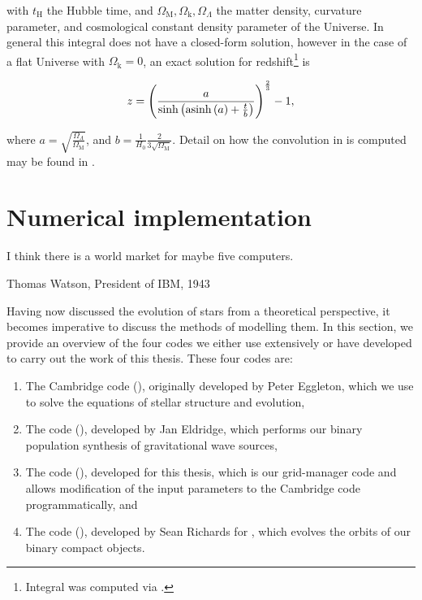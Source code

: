 with $t_\text{H}$ the Hubble time, and $\Omega_\text{M}, \Omega_\text{k}, \Omega_\Lambda$ the matter density, curvature parameter, and cosmological constant density parameter of the Universe. In general this integral does not have a closed-form solution, however in the case of a flat Universe with $\Omega_\text{k}=0$, an exact solution for redshift\footnote{Integral was computed via .} is

\begin{equation}
z = \left(\frac{a}{\sinh\left(\operatorname{asinh}{\left(a \right)}+\frac{t}{b}\right)}\right)^\frac23 - 1,
\end{equation}

where $a=\sqrt{\frac{\Omega_\Lambda}{\Omega_\text{M}}}$, and $b=\frac{1}{H_0}\frac{2}{3\sqrt{\Omega_\text{M}}}$. Detail on how the convolution in  is computed may be found in \citet{Richards:2021}.

\section{Numerical implementation}

\epigraph{I think there is a world market for maybe five computers.}{Thomas Watson, President of IBM, 1943}

Having now discussed the evolution of stars from a theoretical perspective, it becomes imperative to discuss the methods of modelling them. In this section, we provide an overview of the four codes we either use extensively or have developed to carry out the work of this thesis. These four codes are:

\begin{enumerate}
    \item The Cambridge  code (), originally developed by Peter Eggleton, which we use to solve the equations of stellar structure and evolution,
    \item The  code (), developed by Jan Eldridge, which performs our binary population synthesis of gravitational wave sources,
    \item The  code (), developed for this thesis, which is our grid-manager code and allows modification of the input parameters to the Cambridge  code programmatically, and
    \item The  code (), developed by Sean Richards for \citet{Richards:2021}, which evolves the orbits of our binary compact objects.
\end{enumerate}

